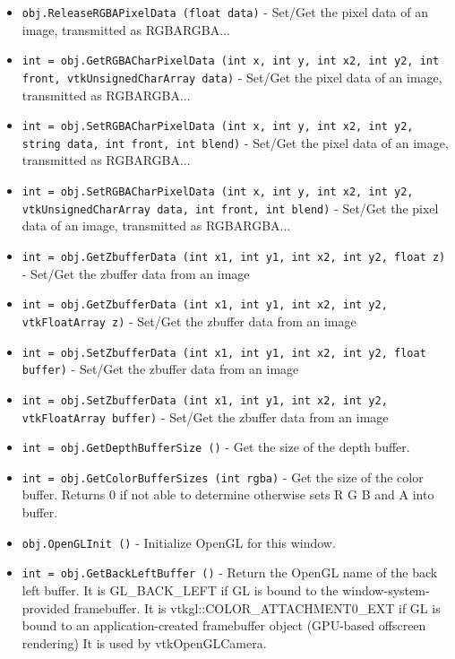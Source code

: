 \begin{itemize}
\item  \verb|obj.ReleaseRGBAPixelData (float data)| -  Set/Get the pixel data of an image, transmitted as RGBARGBA...

\item  \verb|int = obj.GetRGBACharPixelData (int x, int y, int x2, int y2, int front, vtkUnsignedCharArray data)| -  Set/Get the pixel data of an image, transmitted as RGBARGBA...

\item  \verb|int = obj.SetRGBACharPixelData (int x, int y, int x2, int y2, string data, int front, int blend)| -  Set/Get the pixel data of an image, transmitted as RGBARGBA...

\item  \verb|int = obj.SetRGBACharPixelData (int x, int y, int x2, int y2, vtkUnsignedCharArray data, int front, int blend)| -  Set/Get the pixel data of an image, transmitted as RGBARGBA...

\item  \verb|int = obj.GetZbufferData (int x1, int y1, int x2, int y2, float z)| -  Set/Get the zbuffer data from an image

\item  \verb|int = obj.GetZbufferData (int x1, int y1, int x2, int y2, vtkFloatArray z)| -  Set/Get the zbuffer data from an image

\item  \verb|int = obj.SetZbufferData (int x1, int y1, int x2, int y2, float buffer)| -  Set/Get the zbuffer data from an image

\item  \verb|int = obj.SetZbufferData (int x1, int y1, int x2, int y2, vtkFloatArray buffer)| -  Set/Get the zbuffer data from an image

\item  \verb|int = obj.GetDepthBufferSize ()| -  Get the size of the depth buffer.

\item  \verb|int = obj.GetColorBufferSizes (int rgba)| -  Get the size of the color buffer.
 Returns 0 if not able to determine otherwise sets R G B and A into buffer.

\item  \verb|obj.OpenGLInit ()| -  Initialize OpenGL for this window.

\item  \verb|int = obj.GetBackLeftBuffer ()| -  Return the OpenGL name of the back left buffer.
 It is GL\_BACK\_LEFT if GL is bound to the window-system-provided
 framebuffer. It is vtkgl::COLOR\_ATTACHMENT0\_EXT if GL is bound to an
 application-created framebuffer object (GPU-based offscreen rendering)
 It is used by vtkOpenGLCamera.


\end{itemize}
